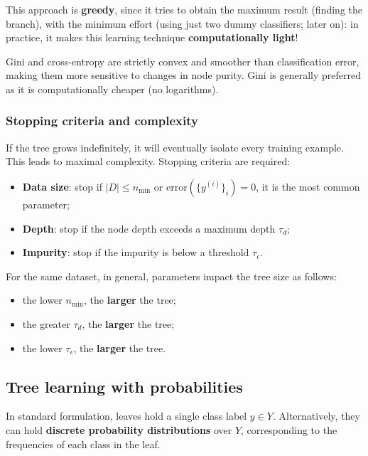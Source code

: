 \vspace{-1em}

This approach is \textbf{greedy}, since it tries to obtain the maximum result (finding the branch), with the minimum effort (using just two dummy classifiers; later on): in practice, it makes this learning technique \textbf{computationally light}!

\begin{tipsblock}
Gini and cross-entropy are strictly convex and smoother than classification error, making them more sensitive to changes in node purity. Gini is generally preferred as it is computationally cheaper (no logarithms).
\end{tipsblock}

\subsubsection{Stopping criteria and complexity}
\label{subsubsec:stopping-criteria}
If the tree grows indefinitely, it will eventually isolate every training example. This leads to maximal complexity. Stopping criteria are required:
\begin{itemize}
    \item \textbf{Data size}: stop if $|D| \le n_{\min}$ or $\text{error}(\{y^{(i)}\}_i) = 0$, it is the most common parameter;
    \item \textbf{Depth}: stop if the node depth exceeds a maximum depth $\tau_d$;
    \item \textbf{Impurity}: stop if the impurity is below a threshold $\tau_\epsilon$.
\end{itemize}
For the same dataset, in general, parameters impact the tree size as follows:
\begin{itemize}[noitemsep]
    \item the lower $n_{\min}$, the \textbf{larger} the tree;
    \item the greater $\tau_d$, the \textbf{larger} the tree;
    \item the lower $\tau_\epsilon$, the \textbf{larger} the tree.
\end{itemize}


\subsection{Tree learning with probabilities}
\label{subsec:tree-probabilities}

In standard formulation, leaves hold a single class label $y \in Y$. Alternatively, they can hold \textbf{discrete probability distributions} over $Y$, corresponding to the frequencies of each class in the leaf.

